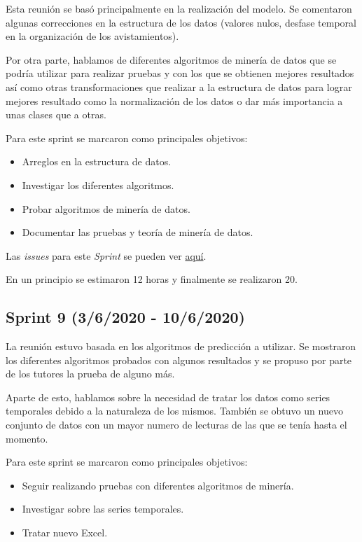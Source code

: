 Esta reunión se basó principalmente en la realización del modelo. Se comentaron algunas correcciones en la estructura de los datos (valores nulos, desfase temporal en la organización de los avistamientos).

Por otra parte, hablamos de diferentes algoritmos de minería de datos que se podría utilizar para realizar pruebas y con los que se obtienen mejores resultados así como otras transformaciones que realizar a la estructura de datos para lograr mejores resultado como la normalización de los datos o dar más importancia a unas clases que a otras.

Para este sprint se marcaron como principales objetivos:
\begin{itemize}
	\item Arreglos en la estructura de datos.
	\item Investigar los diferentes algoritmos.
	\item Probar algoritmos de minería de datos.
	\item Documentar las pruebas y teoría de minería de datos.
\end{itemize} 

Las \emph{issues} para este \emph{Sprint} se pueden ver \href{https://github.com/psnti/TFG-Pablo-Santidrian-Tudanca/milestone/8}{aquí}.


En un principio se estimaron 12 horas y finalmente se realizaron 20.

\subsection{Sprint 9 (3/6/2020 - 10/6/2020)}\label{Sprint-9}
La reunión estuvo basada en los algoritmos de predicción a utilizar. Se mostraron los diferentes algoritmos probados con algunos resultados y se propuso por parte de los tutores la prueba de alguno más.

Aparte de esto, hablamos sobre la necesidad de tratar los datos como series temporales debido a la naturaleza de los mismos. También se obtuvo un nuevo conjunto de datos con un mayor numero de lecturas de las que se tenía hasta el momento.


Para este sprint se marcaron como principales objetivos:
\begin{itemize}
	\item Seguir realizando pruebas con diferentes algoritmos de minería.
	\item Investigar sobre las series temporales.
	\item Tratar nuevo Excel.
\end{itemize} 

